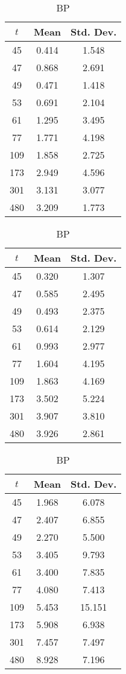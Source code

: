 \begin{table}[ht]
\centering
\begin{subtable}{0.33\textwidth}
\centering
{\tablecolors
\begin{tabular}{|c|c|c|}
\hline
$t$ & Mean & Std. Dev. \\
\hline
45 & 0.414 & 1.548 \\
\hline
47 & 0.868 & 2.691 \\
\hline
49 & 0.471 & 1.418 \\
\hline
53 & 0.691 & 2.104 \\
\hline
61 & 1.295 & 3.495 \\
\hline
77 & 1.771 & 4.198 \\
\hline
109 & 1.858 & 2.725 \\
\hline
173 & 2.949 & 4.596 \\
\hline
301 & 3.131 & 3.077 \\
\hline
480 & 3.209 & 1.773 \\
\hline
\end{tabular}}
\caption{\uo{} BP}
\end{subtable}%
\begin{subtable}{0.33\textwidth}
\centering
{\tablecolors
\begin{tabular}{|c|c|c|}
\hline
$t$ & Mean & Std. Dev. \\
\hline
45 & 0.320 & 1.307 \\
\hline
47 & 0.585 & 2.495 \\
\hline
49 & 0.493 & 2.375 \\
\hline
53 & 0.614 & 2.129 \\
\hline
61 & 0.993 & 2.977 \\
\hline
77 & 1.604 & 4.195 \\
\hline
109 & 1.863 & 4.169 \\
\hline
173 & 3.502 & 5.224 \\
\hline
301 & 3.907 & 3.810 \\
\hline
480 & 3.926 & 2.861 \\
\hline
\end{tabular}}
\caption{\pp{} BP}
\end{subtable}%
\begin{subtable}{0.33\textwidth}
\centering
{\tablecolors
\begin{tabular}{|c|c|c|}
\hline
$t$ & Mean & Std. Dev. \\
\hline
45 & 1.968 & 6.078 \\
\hline
47 & 2.407 & 6.855 \\
\hline
49 & 2.270 & 5.500 \\
\hline
53 & 3.405 & 9.793 \\
\hline
61 & 3.400 & 7.835 \\
\hline
77 & 4.080 & 7.413 \\
\hline
109 & 5.453 & 15.151 \\
\hline
173 & 5.908 & 6.938 \\
\hline
301 & 7.457 & 7.497 \\
\hline
480 & 8.928 & 7.196 \\
\hline


\end{tabular}}
\end{subtable}
\end{table}
